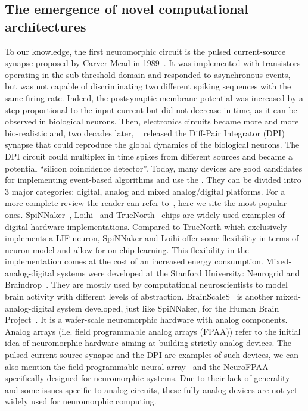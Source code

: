 \documentclass[brainsci, %
               review,submit,pdftex,moreauthors
               ]{Definitions/mdpi}
\begin{document}
\subsection{The emergence of novel computational architectures}
%
To our knowledge, the first neuromorphic circuit is the pulsed current-source synapse proposed by Carver Mead in 1989~\citep{mead_analog_1989}. It was implemented with transistors operating in the sub-threshold domain and responded to asynchronous events, but was not capable of discriminating two different spiking sequences with the same firing rate. Indeed, the postsynaptic membrane potential was increased by a step proportional to the input current but did not decrease in time, as it can be observed in biological neurons. Then, electronics circuits became more and more bio-realistic and, two decades later, ~\citep{bartolozzi_synaptic_2007} released the Diff-Pair Integrator (DPI) synapse that could reproduce the global dynamics of the biological neurons. The DPI circuit could multiplex in time spikes from different sources and became a potential  ``silicon coincidence detector''. Today, many devices are good candidates for implementing event-based algorithms and use the . They can be divided intro 3 major categories: digital, analog and mixed analog/digital platforms. For a more complete review the reader can refer to~\citep{schuman_survey_2017}, here we site the most popular ones. SpiNNaker~\citep{furber_overview_2013, furber_spinnaker_2020}, Loihi~\citep{davies_loihi_2018} and TrueNorth~\citep{merolla_million_2014} chips are widely used examples of digital hardware implementations. Compared to TrueNorth which exclusively implements a LIF neuron, SpiNNaker and Loihi offer some flexibility in terms of neuron model and allow for on-chip learning. This flexibility in the implementation comes at the cost of an increased energy consumption. Mixed-analog-digital systems were developed at the Stanford University: Neurogrid and Braindrop~\citep{benjamin_neurogrid_2014, neckar_braindrop_2019}. They are mostly used by computational neuroscientists to model brain activity with different levels of abstraction. BrainScaleS~\citep{schemmel_wafer-scale_2010} is another mixed-analog-digital system developed, just like SpiNNaker, for the Human Brain Project~\citep{markram_introducing_2011}. It is a wafer-scale neuromorphic hardware with analog components. Analog arrays (i.e. field programmable analog arrays (FPAA)) refer to the initial idea of neuromorphic hardware aiming at building strictly analog devices. The pulsed current source synapse and the DPI are examples of such devices, we can also mention the field programmable neural array~\citep{farquhar_field_2006} and the NeuroFPAA~\citep{cheng_fpaa_2009} specifically designed for neuromorphic systems. Due to their lack of generality and some issues specific to analog circuits, these fully analog devices are not yet widely used for neuromorphic computing. 
\end{document}
